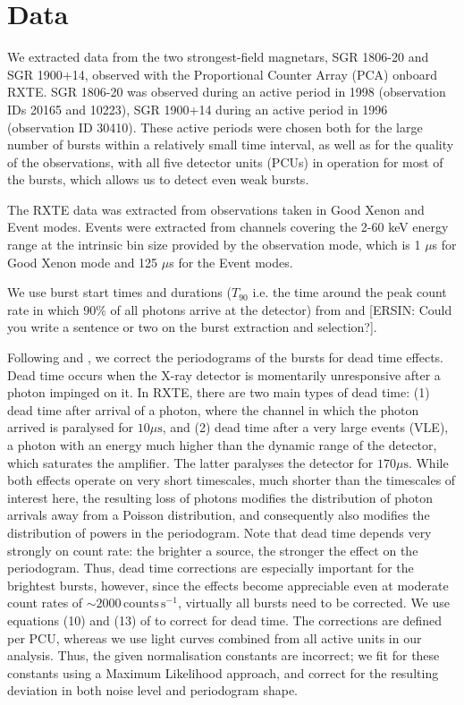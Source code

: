 \documentclass[numberedappendix]{emulateapj}
\begin{document}
\section{Data}
\label{sec:data}

We extracted data from the two strongest-field magnetars, SGR 1806-20 and SGR 1900+14, observed with the Proportional Counter Array (PCA) onboard RXTE. SGR 1806-20 was observed during an active period in 1998 (observation IDs 20165 and 10223), SGR 1900+14 during an active period in 1996 (observation ID 30410). These active periods were chosen both for the large number of bursts within a relatively small time interval, as well as for the quality of the observations, with all five detector units (PCUs) in operation for most of the bursts, which allows us to detect even weak bursts.

The RXTE data was extracted from observations taken in Good Xenon and Event modes. Events were extracted from channels covering the 2-60 keV energy range at the intrinsic bin size provided by the observation mode, which is 1 $\mu$s for Good Xenon mode and 125 $\mu$s for the Event modes.  
 
We use burst start times and durations ($T_{90}$ i.e. the time around the peak count rate in which 90\% of all photons arrive at the detector) from \citet{gogus1999} and \citet{gogus2000} [ERSIN: Could you write a sentence or two on the burst extraction and selection?]. 

Following \citet{zhang1995} and \citet{jahoda2006}, we correct the periodograms of the bursts for dead time effects. Dead time occurs when the X-ray detector is momentarily unresponsive after a photon impinged on it. In RXTE, there are two main types of dead time: (1) dead time after arrival of a photon, where the channel in which the photon arrived is paralysed for $10\mu\mathrm{s}$, and (2) dead time after a very large events (VLE), a photon with an energy much higher than the dynamic range of the detector, which saturates the amplifier. The latter paralyses the detector for $170\mu\mathrm{s}$. While both effects operate on very short timescales, much shorter than the timescales of interest here, the resulting loss of photons modifies the distribution of photon arrivals away from a Poisson distribution, and consequently also modifies the distribution of powers in the periodogram. Note that dead time depends very strongly on count rate: the brighter a source, the stronger the effect on the periodogram. Thus, dead time corrections are especially important for the brightest bursts, however, since the effects become appreciable even at moderate count rates of $\sim 2000 \,\mathrm{counts}\,\mathrm{s}^{-1}$, virtually all bursts need to be corrected. We use equations (10) and (13) of \citet{jahoda2006} to correct for dead time. The corrections are defined per PCU, whereas we use light curves combined from all active units in our analysis. Thus, the given normalisation constants are incorrect; we fit for these constants using a Maximum Likelihood approach, and correct for the resulting deviation in both noise level and periodogram shape. 
\end{document}
